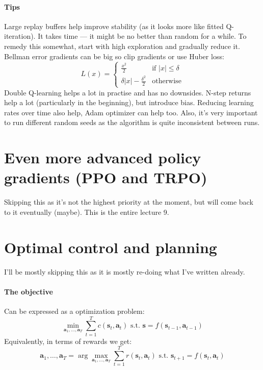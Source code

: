 \documentclass{report}
\newcommand{\argmax}{\arg\!\max}
\begin{document}
\paragraph{Tips} Large replay buffers help improve stability (as it looks more like fitted Q-iteration).
It takes time --- it might be no better than random for a while. To remedy this somewhat, start with high exploration and gradually reduce it.
Bellman error gradients can be big so clip gradients or use Huber loss:
\begin{equation}
		L(x) = \left\{
				\begin{array}{ll}
						\frac{x^2}{2} & \text{if } |x|\leq \delta \\
						\delta|x| - \frac{\delta^2}{2} & \text{otherwise}
				\end{array}
				\right .
\end{equation}
Double Q-learning helps a lot in practise and has no downsides.
N-step returns help a lot (particularly in the beginning), but introduce bias.
Reducing learning rates over time also help, Adam optimizer can help too.
Also, it's very important to run different random seeds as the algorithm is quite inconsistent between runs.

\section{Even more advanced policy gradients (PPO and TRPO)}
Skipping this as it's not the highest priority at the moment, but will come back to it eventually (maybe).
This is the entire lecture 9.

\section{Optimal control and planning}
I'll be mostly skipping this as it is mostly re-doing what I've written already.

\paragraph{The objective}
Can be expressed as a optimization problem:
\begin{equation}
		\min_{\bm{a}_1, \dots, \bm{a}_T} \sum_{t=1}^{T} c(\bm{s}_{t}, \bm{a}_{t}) \text{ s.t. } \bm{s} = f (\bm{s}_{t-1}, \bm{a}_{t-1} ) 
\end{equation}
Equivalently, in terms of rewards we get:
\begin{equation}
		\bm{a}_1, \dots, \bm{a}_T = \argmax_{\bm{a}_1, \dots, \bm{a}_T} \sum_{t=1}^{T} r (\bm{s}_{t}, \bm{a}_{t} ) 
		\text{ s.t. } \bm{s}_{t+1} = f (\bm{s}_{t}, \bm{a}_{t} )
\end{equation}
\end{document}
